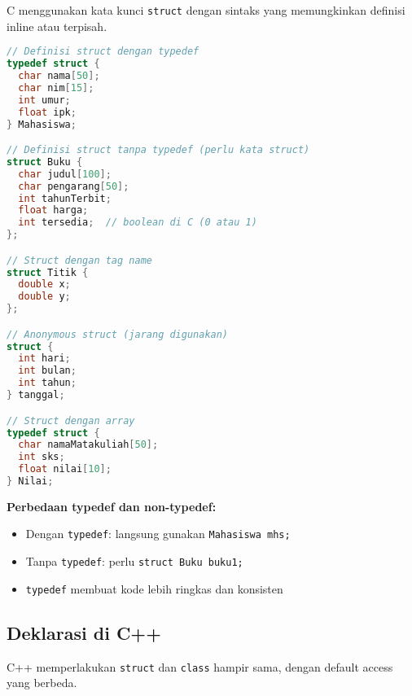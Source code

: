 \documentclass[../main.tex]{subfiles}
\begin{document}
C menggunakan kata kunci \texttt{struct} dengan sintaks yang memungkinkan definisi inline atau terpisah.

\begin{lstlisting}[language=C, caption={Deklarasi struct di C}]
// Definisi struct dengan typedef
typedef struct {
  char nama[50];
  char nim[15];
  int umur;
  float ipk;
} Mahasiswa;

// Definisi struct tanpa typedef (perlu kata struct)
struct Buku {
  char judul[100];
  char pengarang[50];
  int tahunTerbit;
  float harga;
  int tersedia;  // boolean di C (0 atau 1)
};

// Struct dengan tag name
struct Titik {
  double x;
  double y;
};

// Anonymous struct (jarang digunakan)
struct {
  int hari;
  int bulan;
  int tahun;
} tanggal;

// Struct dengan array
typedef struct {
  char namaMatakuliah[50];
  int sks;
  float nilai[10];
} Nilai;
\end{lstlisting}

\textbf{Perbedaan typedef dan non-typedef:}
\begin{itemize}
  \item Dengan \texttt{typedef}: langsung gunakan \texttt{Mahasiswa mhs;}
  \item Tanpa \texttt{typedef}: perlu \texttt{struct Buku buku1;}
  \item \texttt{typedef} membuat kode lebih ringkas dan konsisten
\end{itemize}

\subsection{Deklarasi di C++}

C++ memperlakukan \texttt{struct} dan \texttt{class} hampir sama, dengan default access yang berbeda.
\end{document}
